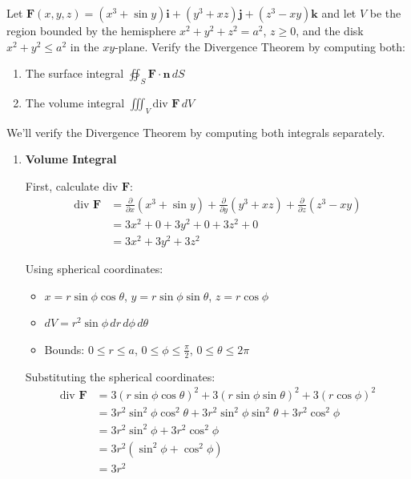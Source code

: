 \begin{example}
Let $\mathbf{F}(x,y,z) = (x^3 + \sin y)\mathbf{i} + (y^3 + xz)\mathbf{j} + (z^3 - xy)\mathbf{k}$ and let $V$ be the region bounded by the hemisphere $x^2 + y^2 + z^2 = a^2$, $z \geq 0$, and the disk $x^2 + y^2 \leq a^2$ in the $xy$-plane. Verify the Divergence Theorem by computing both:
\begin{enumerate}
    \item The surface integral $\oiint_S \mathbf{F} \cdot \mathbf{n}\,dS$
    \item The volume integral $\iiint_V \text{div }\mathbf{F}\,dV$
\end{enumerate}

\begin{solution}
We'll verify the Divergence Theorem by computing both integrals separately.

\begin{enumerate}
    \item \textbf{Volume Integral}
    
    First, calculate $\text{div }\mathbf{F}$:
    \begin{align*}
    \text{div }\mathbf{F} &= \frac{\partial}{\partial x}(x^3 + \sin y) + \frac{\partial}{\partial y}(y^3 + xz) + \frac{\partial}{\partial z}(z^3 - xy) \\
    &= 3x^2 + 0 + 3y^2 + 0 + 3z^2 + 0 \\
    &= 3x^2 + 3y^2 + 3z^2
    \end{align*}
    
    Using spherical coordinates:
    \begin{itemize}
        \item $x = r\sin\phi\cos\theta$, $y = r\sin\phi\sin\theta$, $z = r\cos\phi$
        \item $dV = r^2\sin\phi \, dr \, d\phi \, d\theta$
        \item Bounds: $0 \leq r \leq a$, $0 \leq \phi \leq \frac{\pi}{2}$, $0 \leq \theta \leq 2\pi$
    \end{itemize}
    
    Substituting the spherical coordinates:
    \begin{align*}
    \text{div }\mathbf{F} &= 3(r\sin\phi\cos\theta)^2 + 3(r\sin\phi\sin\theta)^2 + 3(r\cos\phi)^2 \\
    &= 3r^2\sin^2\phi\cos^2\theta + 3r^2\sin^2\phi\sin^2\theta + 3r^2\cos^2\phi \\
    &= 3r^2\sin^2\phi + 3r^2\cos^2\phi \\
    &= 3r^2(\sin^2\phi + \cos^2\phi) \\
    &= 3r^2
    \end{align*}
    

\end{enumerate}
\end{solution}
\end{example}
